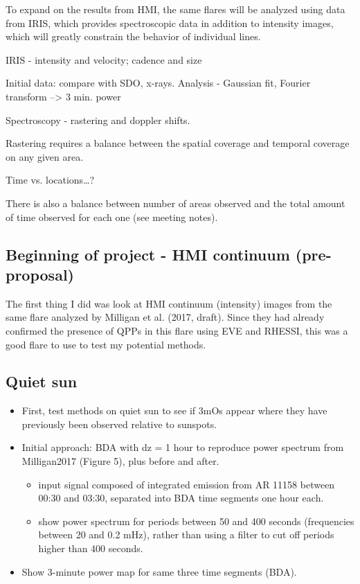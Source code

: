 To expand on the results from HMI, the same flares will be analyzed using data
from IRIS, which provides spectroscopic data in addition to intensity images,
which will greatly constrain the behavior of individual lines.

IRIS - intensity and velocity; cadence and size

Initial data: compare with SDO, x-rays.
Analysis - Gaussian fit, Fourier transform --> 3 min. power

Spectroscopy - rastering and doppler shifts.

Rastering requires a balance between the spatial coverage and temporal coverage on
any given area.

Time vs. locations\ldots ?

There is also a balance between number of areas observed and the total amount of
time observed for each one (see meeting notes).

\subsection{Beginning of project - HMI continuum (pre-proposal)}
The first thing I did was look at HMI continuum (intensity) images from the
same flare analyzed by Milligan et al. (2017, draft). Since they had already
confirmed the presence of QPPs in this flare using EVE and RHESSI,
this was a good flare to use to test my potential methods.

\subsection{Quiet sun}

\begin{itemize}
    \item First, test methods on quiet sun to see if 3mOs appear where
        they have previously been observed relative to sunspots.
    \item Initial approach: BDA with dz = 1 hour to
        reproduce power spectrum from Milligan2017 (Figure 5), plus
        before and after.
        \begin{itemize}
            \item input signal composed of integrated emission from AR 11158
                between 00:30 and 03:30, separated into BDA time segments
                one hour each.
            \item show power spectrum for periods between 50 and 400 seconds
                (frequencies between 20 and 0.2 mHz), rather
                than using a filter to cut off periods higher than 400 seconds.
        \end{itemize}
    \item Show 3-minute power map for same three time segments (BDA).
\end{itemize}


